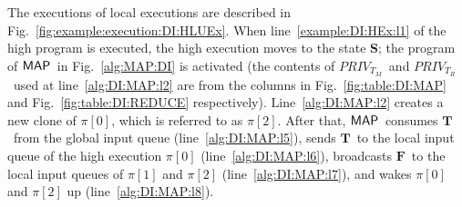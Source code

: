 \documentclass[10pt,a4paper,oneside]{article}
\def\sS{\textbf{S}}
\def\VTRUE{\ensuremath{\textbf{T}}}
\def\VFALSE{\ensuremath{\textbf{F}}}
\def\sanserif#1{\ensuremath{\sf #1}}
\def\MAP{\ensuremath{\sanserif{MAP}}}
\def\Prog{\ensuremath{\pi}}
\def\Progl#1{\ensuremath{\Prog[#1]}}
\def\tcolm{\ensuremath{PRIV_{T_M}}}
\def\tcolr{\ensuremath{PRIV_{T_R}}}
\begin{document}
The executions of local executions are described in Fig.~\ref{fig:example:execution:DI:HLUEx}. When line~\ref{example:DI:HEx:l1} of the high program is executed, the high execution moves to the state \sS; the program of \MAP\ in Fig.~\ref{alg:MAP:DI} is activated (the contents of \tcolm\ and \tcolr\ used at line~\ref{alg:DI:MAP:l2} are from the columns  in Fig.~\ref{fig:table:DI:MAP} and Fig.~\ref{fig:table:DI:REDUCE} respectively). Line~\ref{alg:DI:MAP:l2} creates a new clone of \Progl{0}, which is referred to as \Progl{2}. After that, \MAP\ consumes \VTRUE\ from the global input queue (line~\ref{alg:DI:MAP:l5}), sends \VTRUE\ to the local input queue of the high execution \Progl{0} (line~\ref{alg:DI:MAP:l6}), broadcasts \VFALSE\ to the local input queues of  \Progl{1} and \Progl{2} (line~\ref{alg:DI:MAP:l7}), and wakes \Progl{0} and \Progl{2} up (line~\ref{alg:DI:MAP:l8}).
\end{document}
